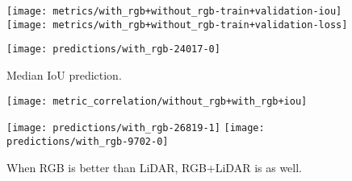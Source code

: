 \begin{figure}[H]
  \centering
  \texttt{[image: metrics/with\_rgb+without\_rgb-train+validation-iou]}
  \texttt{[image: metrics/with\_rgb+without\_rgb-train+validation-loss]}
\end{figure}

\begin{figure}[H]
  \centering
  \texttt{[image: predictions/with\_rgb-24017-0]}  %
  \caption{%
    Median IoU prediction.
  }
\end{figure}

\begin{figure}[H]
  \centering
  \texttt{[image: metric\_correlation/without\_rgb+with\_rgb+iou]}
\end{figure}

\begin{figure}[H]
  \centering
  \texttt{[image: predictions/with\_rgb-26819-1]}  %
  \textcolor{gray}{\vrule}
  \texttt{[image: predictions/with\_rgb-9702-0]}  %
  \caption{%
    When RGB is better than LiDAR, RGB+LiDAR is as well.
  }
\end{figure}
